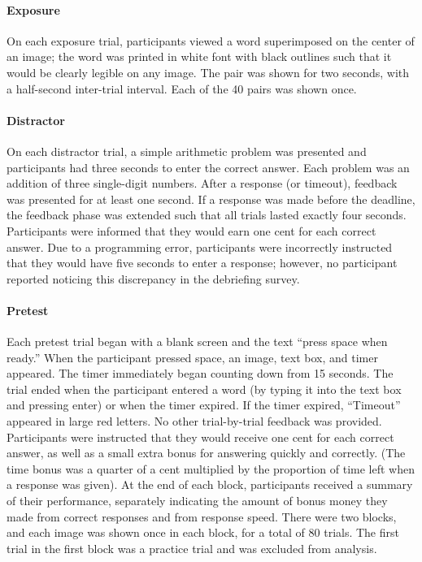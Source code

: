 \paragraph{Exposure} On each exposure trial, participants viewed a word superimposed on the center of an image; the word was printed in white font with black outlines such that it would be clearly legible on any image. The pair was shown for two seconds, with a half-second inter-trial interval. Each of the 40 pairs was shown once.

\paragraph{Distractor} On each distractor trial, a simple arithmetic problem was presented and participants had three seconds to enter the correct answer. Each problem was an addition of three single-digit numbers. After a response (or timeout), feedback was presented for at least one second. If a response was made before the deadline, the feedback phase was extended such that all trials lasted exactly four seconds. Participants were informed that they would earn one cent for each correct answer. Due to a programming error, participants were incorrectly instructed that they would have five seconds to enter a response; however, no participant reported noticing this discrepancy in the debriefing survey.

\paragraph{Pretest} Each pretest trial began with a blank screen and the text ``press space when ready.'' When the participant pressed space, an image, text box, and timer appeared. The timer immediately began counting down from 15 seconds. The trial ended when the participant entered a word (by typing it into the text box and pressing enter) or when the timer expired. If the timer expired, ``Timeout'' appeared in large red letters. No other trial-by-trial feedback was provided. Participants were instructed that they would receive one cent for each correct answer, as well as a small extra bonus for answering quickly and correctly. (The time bonus was a quarter of a cent multiplied by the proportion of time left when a response was given). At the end of each block, participants received a summary of their performance, separately indicating the amount of bonus money they made from correct responses and from response speed. There were two blocks, and each image was shown once in each block, for a total of 80 trials. The first trial in the first block was a practice trial and was excluded from analysis.

